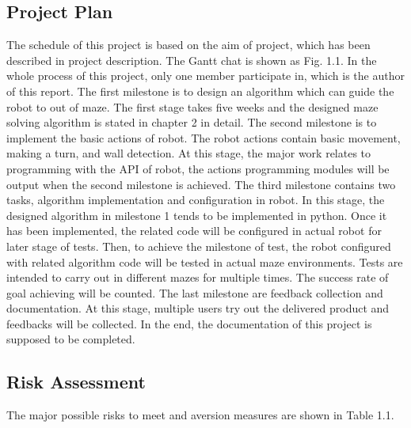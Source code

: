 \documentclass[11pt,times,oneside,openright,hardcopy]{eeereport}
\begin{document}
\subsection{Project Plan}
The schedule of this project is based on the aim of project, which has been described in project description. The Gantt chat is shown as Fig. 1.1. In the whole process of this project, only one member participate in, which is the author of this report.
The first milestone is to design an algorithm which can guide the robot to out of maze. The first stage takes five weeks and the designed maze solving algorithm is stated in chapter 2 in detail. 
The second milestone is to implement the basic actions of robot. The robot actions contain basic movement, making a turn, and wall detection. At this stage, the major work relates to programming with the API of robot, the actions programming modules will be output when the second milestone is achieved.
The third milestone contains two tasks, algorithm implementation and configuration in robot. In this stage, the designed algorithm in milestone 1 tends to be implemented in python. Once it has been implemented, the related code will be configured in actual robot for later stage of tests. 
Then, to achieve the milestone of test, the robot configured with related algorithm code will be tested in actual maze environments. Tests are intended to carry out in different mazes for multiple times. The success rate of goal achieving will be counted.
The last milestone are feedback collection and documentation. At this stage, multiple users try out the delivered product and feedbacks will be collected. In the end, the documentation of this project is supposed to be completed.


\subsection{Risk Assessment}
The major possible risks to meet and aversion measures are shown in Table 1.1.
\end{document}
